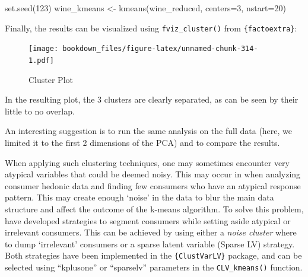 \documentclass[
]{krantz}
\makeatletter
\newenvironment{Shaded}{\begin{snugshade}}{\end{snugshade}}
\newcommand{\AttributeTok}[1]{\textcolor[rgb]{0.61,0.61,0.61}{#1}}
\newcommand{\ConstantTok}[1]{\textcolor[rgb]{0,0,0}{#1}}
\newcommand{\DecValTok}[1]{\textcolor[rgb]{0.06,0.06,0.06}{#1}}
\newcommand{\FunctionTok}[1]{\textcolor[rgb]{0,0,0}{#1}}
\newcommand{\NormalTok}[1]{#1}
\newcommand{\OtherTok}[1]{\textcolor[rgb]{0.37,0.37,0.37}{#1}}
\newcommand{\SpecialCharTok}[1]{\textcolor[rgb]{0,0,0}{#1}}
\newcommand{\StringTok}[1]{\textcolor[rgb]{0.5,0.5,0.5}{#1}}
\renewenvironment{quote}{\begin{VF}}{\end{VF}}
\newenvironment{kframe}{%
\medskip{}
\setlength{\fboxsep}{.8em}
 \def\at@end@of@kframe{}%
 \ifinner\ifhmode%
  \def\at@end@of@kframe{\end{minipage}}%
  \begin{minipage}{\columnwidth}%
 \fi\fi%
 \def\FrameCommand##1{\hskip\@totalleftmargin \hskip-\fboxsep
 \colorbox{shadecolor}{##1}\hskip-\fboxsep
     \hskip-\linewidth \hskip-\@totalleftmargin \hskip\columnwidth}%
 \MakeFramed {\advance\hsize-\width
   \@totalleftmargin\z@ \linewidth\hsize
   \@setminipage}}%
 {\par\unskip\endMakeFramed%
 \at@end@of@kframe}
\renewenvironment{Shaded}{\begin{kframe}}{\end{kframe}}
\makeatother
\begin{document}
\begin{Shaded}
\begin{Highlighting}[]
\FunctionTok{set.seed}\NormalTok{(}\DecValTok{123}\NormalTok{)}
\NormalTok{wine\_kmeans }\OtherTok{\textless{}{-}} \FunctionTok{kmeans}\NormalTok{(wine\_reduced, }\AttributeTok{centers=}\DecValTok{3}\NormalTok{, }\AttributeTok{nstart=}\DecValTok{20}\NormalTok{)}
\end{Highlighting}
\end{Shaded}

Finally, the results can be visualized using \texttt{fviz\_cluster()} from \texttt{\{factoextra\}}:

\begin{Shaded}
\end{Shaded}

\begin{figure}
\centering
\texttt{[image: bookdown\_files/figure-latex/unnamed-chunk-314-1.pdf]}
\caption{\label{fig:unnamed-chunk-314}Cluster Plot}
\end{figure}

In the resulting plot, the 3 clusters are clearly separated, as can be seen by their little to no overlap.

\begin{quote}
An interesting suggestion is to run the same analysis on the full data (here, we limited it to the first 2 dimensions of the PCA) and to compare the results.
\end{quote}

When applying such clustering techniques, one may sometimes encounter very atypical variables that could be deemed noisy. This may occur in when analyzing consumer hedonic data and finding few consumers who have an atypical response pattern. This may create enough `noise' in the data to blur the main data structure and affect the outcome of the k-means algorithm. To solve this problem, \citet{vigneau2016} have developed strategies to segment consumers while setting aside atypical or irrelevant consumers. This can be achieved by using either a \emph{noise cluster} where to dump `irrelevant' consumers or a sparse latent variable (Sparse LV) strategy. Both strategies have been implemented in the \texttt{\{ClustVarLV\}} package, and can be selected using ``kplusone'' or ``sparselv'' parameters in the \texttt{CLV\_kmeans()} function.
\end{document}
